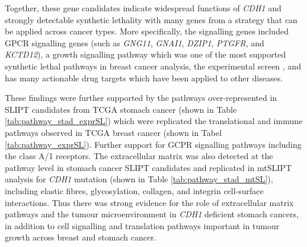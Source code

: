 Together, these gene candidates indicate widespread functions of \textit{CDH1} and strongly detectable synthetic lethality with many genes from a strategy that can be applied across cancer types. More specifically, the signalling genes included GPCR signalling genes (such as \textit{GNG11}, \textit{GNAI1}, \textit{DZIP1}, \textit{PTGFR}, and \textit{KCTD12}), a growth signalling pathway which was one of the most supported synthetic lethal pathways in breast cancer analysis, the experimental screen \citep{Telford2015}, and has many actionable drug targets which have been applied to other diseases.

These findings were further supported by the pathways over-represented in SLIPT candidates from TCGA stomach cancer (shown in Table \ref{tab:pathway_stad_exprSL}) which were replicated the translational and immune pathways observed in TCGA breast cancer (shown in Tabel \ref{tab:pathway_exprSL}). Further support for GCPR signalling pathways including the class A/1 receptors. The extracellular matrix was also detected at the pathway level in stomach cancer SLIPT candidates and replicated in mtSLIPT analysis for \textit{CDH1} mutation (shown in Table \ref{tab:pathway_stad_mtSL}), including elastic fibres, glycosylation, collagen, and integrin cell-surface interactions. Thus there was strong evidence for the role of extracellular matrix pathways and the tumour microenvironment in \textit{CDH1} deficient stomach cancers, in addition to cell signalling and translation pathways important in tumour growth across breast and stomach cancer.


